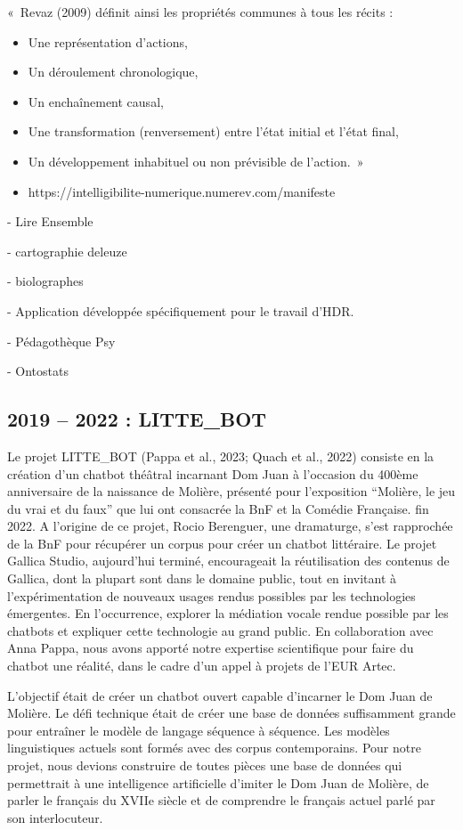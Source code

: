 \documentclass[
  a4paper,
  DIV=11,
  numbers=noendperiod]{scrreprt}
\providecommand{\tightlist}{%
  \setlength{\itemsep}{0pt}\setlength{\parskip}{0pt}}\usepackage{longtable,booktabs,array}
\begin{document}
«~Revaz (2009) définit ainsi les propriétés communes à tous les récits :

\begin{itemize}
\tightlist
\item
  Une représentation d'actions,
\item
  Un déroulement chronologique,
\item
  Un enchaînement causal,
\item
  Une transformation (renversement) entre l'état initial et l'état
  final,
\item
  Un développement inhabituel ou non prévisible de l'action.~»
\item
  https://intelligibilite-numerique.numerev.com/manifeste
\end{itemize}

- Lire Ensemble

- cartographie deleuze

- biolographes

- Application développée spécifiquement pour le travail d'HDR.

- Pédagothèque Psy

- Ontostats

\subsection{2019 -- 2022 : LITTE\_BOT}\label{sec-projetLitteBot}

Le projet LITTE\_BOT (Pappa et al., 2023; Quach et al., 2022) consiste
en la création d'un chatbot théâtral incarnant Dom Juan à l'occasion du
400ème anniversaire de la naissance de Molière, présenté pour
l'exposition ``Molière, le jeu du vrai et du faux'' que lui ont
consacrée la BnF et la Comédie Française. fin 2022. A l'origine de ce
projet, Rocio Berenguer, une dramaturge, s'est rapprochée de la BnF pour
récupérer un corpus pour créer un chatbot littéraire. Le projet Gallica
Studio, aujourd'hui terminé, encourageait la réutilisation des contenus
de Gallica, dont la plupart sont dans le domaine public, tout en
invitant à l'expérimentation de nouveaux usages rendus possibles par les
technologies émergentes. En l'occurrence, explorer la médiation vocale
rendue possible par les chatbots et expliquer cette technologie au grand
public. En collaboration avec Anna Pappa, nous avons apporté notre
expertise scientifique pour faire du chatbot une réalité, dans le cadre
d'un appel à projets de l'EUR Artec.

L'objectif était de créer un chatbot ouvert capable d'incarner le Dom
Juan de Molière. Le défi technique était de créer une base de données
suffisamment grande pour entraîner le modèle de langage séquence à
séquence. Les modèles linguistiques actuels sont formés avec des corpus
contemporains. Pour notre projet, nous devions construire de toutes
pièces une base de données qui permettrait à une intelligence
artificielle d'imiter le Dom Juan de Molière, de parler le français du
XVIIe siècle et de comprendre le français actuel parlé par son
interlocuteur.
\end{document}
